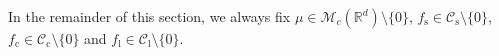 \documentclass[12pt,a4paper]{amsart}
\theoremstyle{plain}
\theoremstyle{definition}
\numberwithin{equation}{section}
\begin{document}
	In the remainder of this section,
	we always fix $\mu \in \mathcal M_c(\mathbb R^d)\setminus\{0\}$, $f_\mathrm s\in \mathcal C_\mathrm s\setminus\{0\}$,  $f_\mathrm c\in \mathcal C_\mathrm c\setminus\{0\}$ and $f_\mathrm l\in \mathcal C_\mathrm l\setminus\{0\}$.
\begin{comment}
	For any random variable $Y$ with finite mean under $\mathbb P_\mu$, we define
\begin{align}
	\mathcal I_r^t Y := \mathbb P_\mu[Y|\mathscr F_{t\vee 0}] - \mathbb P_\mu[Y|\mathscr F_{r\vee 0}], \quad -\infty < r, t <\infty.
\end{align}
	For each $t\geq 1$,
	we have the following decomposition.
\begin{align}
	I^{f_\mathrm s}(t) 
	&:= \frac{X_t(f_\mathrm s)}{\|X_t\|^{1- \tilde \beta }}  = I^{f_\mathrm s}_1(t) + I^{f_\mathrm s}_2(t) + I^{f_\mathrm s}_3(t)
    \\&:=  \Big(\sum_{k\in \mathbb N \cap [0,t-\ln t]}  \frac{\mathcal I_{t-k-1}^{t-k} X_t(f_\mathrm s)}{\|X_t\|^{1-\tilde \beta} } \Big) + \Big(\sum_{k\in\mathbb{N}\cap(t-\ln t, t]} \frac{\mathcal I_{t-k-1}^{t-k} X_t(f_\mathrm s)}{\|X_t\|^{1-\tilde \beta}}  \Big) + \Big( \frac{X_0(P_t^\alpha f_\mathrm s)}{\|X_t\|^{1-\tilde \beta}}\Big),
    \\ I^{f_\mathrm c}(t)&:=\frac{X_t(f_\mathrm c)}{\|tX_t\|^{1-\tilde \beta}} = I^{f_\mathrm c}_1(t) + I^{f_\mathrm c}_2(t) + I^{f_\mathrm c}_3(t)
    \\&:=  \Big(\sum_{k\in \mathbb N \cap [0,t-\ln t]}  \frac{\mathcal I_{t-k-1}^{t-k} X_t(f_\mathrm c)}{\|tX_t\|^{1-\tilde \beta} } \Big) + \Big(\sum_{k\in\mathbb{N}\cap(t-\ln t, t]} \frac{\mathcal I_{t-k-1}^{t-k} X_t(f_\mathrm c)}{\|tX_t\|^{1-\tilde \beta}}  \Big)    + \Big( \frac{X_0(P_t^\alpha f_\mathrm c)}{\|tX_t\|^{1-\tilde \beta}}\Big),
    \\ I^{f_\mathrm l}(t) &:= \frac{X_t(f_\mathrm l) - \mathrm x_t(f_\mathrm l)}{\|X_t\|^{1- \tilde \beta}}
  	= I^{f_\mathrm l}_1(t) + I^{f_\mathrm l}_2(t) + I^{f_\mathrm l}_3(t)
  	\\& := \Big(\sum_{k\in \mathbb N \cap [0,t^2]} \frac{ \mathcal I_{t+k+1}^{t+k}\mathrm x_t(f_\mathrm l)}{\|X_t\|^{1- \tilde \beta}}\Big) + \Big(\sum_{k\in \mathbb N \cap (t^2,\infty)}  \frac{ \mathcal I_{t+k+1}^{t+k}\mathrm x_t(f_\mathrm l)}{\|X_t\|^{1- \tilde \beta}}\Big)+0,
\end{align}
	where $\mathrm x_t(f_\mathrm l)$ is defined in \eqref{eq:oldResult} with $f$ replaced with $f_\mathrm l$.
\end{comment}
\end{document}
